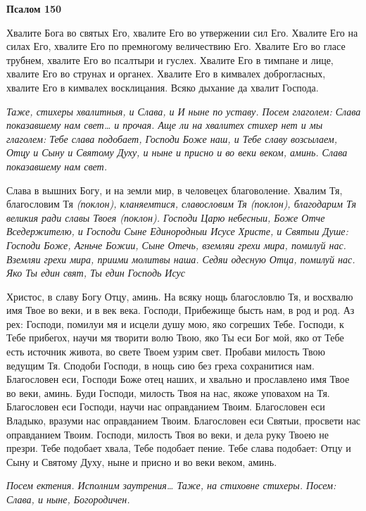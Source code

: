  

\bfseries Псалом 150\normalfont{}


   Хвалите Бога во святых Его, хвалите Его во утвержении сил Его.
Хвалите Его на силах Его, хвалите Его по премногому величествию Его.
Хвалите Его во гласе трубнем, хвалите Его во псалтыри и гуслех. Хвалите
Его в тимпане и лице, хвалите Его во струнах и органех. Хвалите Его в
кимвалех доброгласных, хвалите Его в кимвалех восклицания. Всяко
дыхание да хвалит Господа.


 \itshape Таже, стихеры хвалитныя, и Слава, и И ныне по уставу. Посем глаголем:\normalfont{}
Слава показавшему нам свет… \itshape и прочая. Аще ли на хвалитех стихер нет и мы
глаголем:\normalfont{} Тебе слава подобает, Господи Боже наш, и Тебе славу возсылаем,
Отцу и Сыну и Святому Духу, и ныне и присно и во веки веком, аминь.
Слава показавшему нам свет.


   Слава в вышних Богу, и на земли мир, в человецех благоволение. Хвалим
Тя, благословим Тя \itshape (поклон)\normalfont{}, кланяемтися, славословим Тя \itshape (поклон)\normalfont{},
благодарим Тя великия ради славы Твоея \itshape (поклон)\normalfont{}. Господи Царю небесныи,
Боже Отче Вседержителю, и Господи Сыне Единородныи Исусе Христе, и
Святыи Душе: Господи Боже, Агньче Божии, Сыне Отечь, вземляи грехи
мира, помилуй нас. Вземляи грехи мира, приими молитвы наша. Седяи
одесную Отца, помилуй нас. Яко Ты един свят, Ты един Господь Исус

Христос, в славу Богу Отцу, аминь. На всяку нощь благословлю Тя, и
восхвалю имя Твое во веки, и в век века. Господи, Прибежище бысть нам, в
род и род. Аз рех: Господи, помилуи мя и исцели душу мою, яко согреших
Тебе. Господи, к Тебе прибегох, научи мя творити волю Твою, яко
Ты еси Бог мой, яко от Тебе есть источник живота, во свете Твоем
узрим свет. Пробави милость Твою ведущим Тя. Сподоби Господи, в
нощь сию без греха сохранитися нам. Благословен еси, Господи Боже
отец наших, и хвально и прославлено имя Твое во веки, аминь. Буди
Господи, милость Твоя на нас, якоже уповахом на Тя. Благословен еси
Господи, научи нас оправданием Твоим. Благословен еси Владыко,
вразуми нас оправданием Твоим. Благословен еси Святыи, просвети нас
оправданием Твоим. Господи, милость Твоя во веки, и дела руку Твоею
не презри. Тебе подобает хвала, Тебе подобает пение. Тебе слава
подобает: Отцу и Сыну и Святому Духу, ныне и присно и во веки веком,
аминь.


 \itshape Посем ектения.\normalfont{} Исполним заутрения… \itshape Таже, на стиховне стихеры. Посем:\normalfont{}
\itshape Слава, и ныне\normalfont{}, Богородичен.


